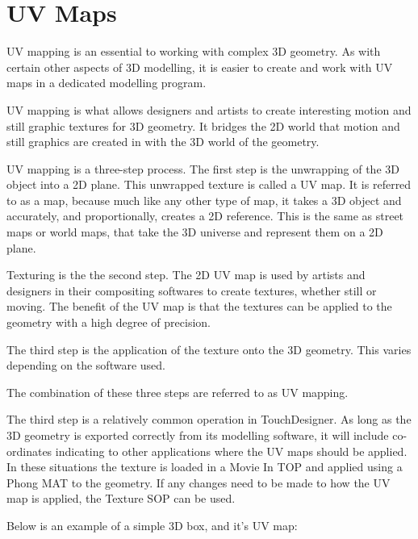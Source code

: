 
\section{UV Maps}

\begin{fullwidth}

UV mapping is an essential to working with complex 3D geometry. As with certain other aspects of 3D modelling, it is easier to create and work with UV maps in a dedicated modelling program.

UV mapping is what allows designers and artists to create interesting motion and still graphic textures for 3D geometry. It bridges the 2D world that motion and still graphics are created in with the 3D world of the geometry. 

UV mapping is a three-step process. The first step is the unwrapping of the 3D object into a 2D plane. This unwrapped texture is called a UV map. It is referred to as a map, because much like any other type of map, it takes a 3D object and accurately, and proportionally, creates a 2D reference. This is the same as street maps or world maps, that take the 3D universe and represent them on a 2D plane.

Texturing is the the second step. The 2D UV map is used by artists and designers in their compositing softwares to create textures, whether still or moving. The benefit of the UV map is that the textures can be applied to the geometry with a high degree of precision.

The third step is the application of the texture onto the 3D geometry. This varies depending on the software used.

The combination of these three steps are referred to as UV mapping.

The third step is a relatively common operation in TouchDesigner. As long as the 3D geometry is exported correctly from its modelling software, it will include co-ordinates indicating to other applications where the UV maps should be applied. In these situations the texture is loaded in a Movie In TOP and applied using a Phong MAT to the geometry. If any changes need to be made to how the UV map is applied, the Texture SOP can be used. 

Below is an example of a simple 3D box, and it's UV map:


\end{fullwidth}
